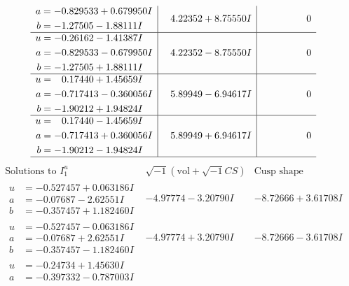 \documentclass[1p]{elsarticle_modified}
\theoremstyle{definition}
\newcommand{\I}{\sqrt{-1}}
\begin{document}
$$\begin{array}{c|c|c}
\begin{aligned}
a &= -0.829533 + 0.679950 I \\
b &= -1.27505 - 1.88111 I\end{aligned}
 & \phantom{-}4.22352 + 8.75550 I & \phantom{-0.000000 } 0 \\ \hline\begin{aligned}
u &= -0.26162 - 1.41387 I \\
a &= -0.829533 - 0.679950 I \\
b &= -1.27505 + 1.88111 I\end{aligned}
 & \phantom{-}4.22352 - 8.75550 I & \phantom{-0.000000 } 0 \\ \hline\begin{aligned}
u &= \phantom{-}0.17440 + 1.45659 I \\
a &= -0.717413 - 0.360056 I \\
b &= -1.90212 + 1.94824 I\end{aligned}
 & \phantom{-}5.89949 - 6.94617 I & \phantom{-0.000000 } 0 \\ \hline\begin{aligned}
u &= \phantom{-}0.17440 - 1.45659 I \\
a &= -0.717413 + 0.360056 I \\
b &= -1.90212 - 1.94824 I\end{aligned}
 & \phantom{-}5.89949 + 6.94617 I & \phantom{-0.000000 } 0\\
 \hline 
 \end{array}$$\newpage$$\begin{array}{c|c|c}  
\text{Solutions to }I^u_{1}& \I (\text{vol} + \sqrt{-1}CS) & \text{Cusp shape}\\
 \hline 
\begin{aligned}
u &= -0.527457 + 0.063186 I \\
a &= -0.07687 - 2.62551 I \\
b &= -0.357457 + 1.182460 I\end{aligned}
 & -4.97774 - 3.20790 I & -8.72666 + 3.61708 I \\ \hline\begin{aligned}
u &= -0.527457 - 0.063186 I \\
a &= -0.07687 + 2.62551 I \\
b &= -0.357457 - 1.182460 I\end{aligned}
 & -4.97774 + 3.20790 I & -8.72666 - 3.61708 I \\ \hline\begin{aligned}
u &= -0.24734 + 1.45630 I \\
a &= -0.397332 - 0.787003 I \\

\end{aligned}
\end{array}$$
\end{document}
